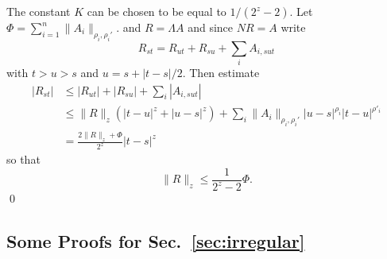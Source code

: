 \documentclass[a4paper,12pt,reqno]{amsproc}
\newcommand{\norm}[1]{\lVert #1\rVert}
\begin{document}
The constant $K$ can be chosen to be equal to $1/(2^z-2)$. 
Let
 $\Phi = \sum_{i=1}^n
\|A_i\|_{\rho_i,\rho_i'}$.
and $R=\Lambda A$ and
since $N R = A$ write
\begin{equation*}
  R_{st} = R_{ut} + R_{su} + \sum_i A_{i,sut}
\end{equation*}
with $t>u>s$ and $u = s+|t-s|/2$. Then estimate
\begin{equation*}
  \begin{split}
  |R_{st}| & \le |R_{ut}| + |R_{su}| + \sum_i |A_{i,sut}|
    \\ & \le  \norm{R}_z (|t-u|^z+|u-s|^z) + \sum_i
    \|A_i\|_{\rho_i,\rho_i'} |u-s|^{\rho_i} |t-u|^{\rho'_i}  
\\ & =  \frac{2 \norm{R}_z + \Phi}{2^z}  |t-s|^z 
  \end{split}
\end{equation*}
so that
\begin{equation*}
  \norm{R}_z \le \frac{1}{2^z-2} \Phi.
\end{equation*}
\qed


\subsection{Some Proofs for Sec.~\ref{sec:irregular}}
\end{document}
